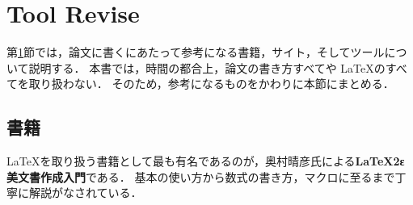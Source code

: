 \section{Tool Revise}
\label{lab:tool_revise}

第\ref{lab:tool_revise}節では，論文に書くにあたって参考になる書籍，サイト，そしてツールについて説明する．
本書では，時間の都合上，論文の書き方すべてや \LaTeX のすべてを取り扱わない．
そのため，参考になるものをかわりに本節にまとめる．

\subsection{書籍}

\LaTeX を取り扱う書籍として最も有名であるのが，奥村晴彦氏による\textbf{LaTeX2ε美文書作成入門}\cite{bibun:online}である．
基本の使い方から数式の書き方，マクロに至るまで丁寧に解説がなされている．


